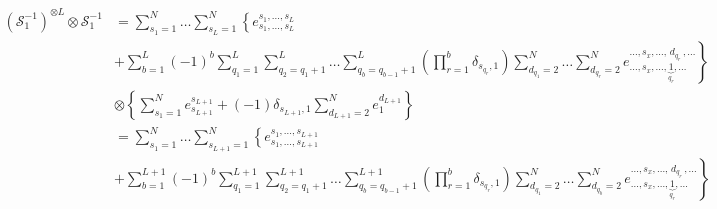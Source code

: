 \documentclass[11pt]{article}
\numberwithin{equation}{section}
\numberwithin{equation}{subsection}
\begin{document}
\begin{align*}
\left(\mathcal{S}_{1}^{-1}\right)^{\otimes L}\otimes \mathcal{S}_{1}^{-1}&=
\sum_{s_{1}=1}^{N}\ldots\sum_{s_{L}=1}^{N}\left\{e_{s_{1},\ldots,s_{L}}^{s_{1},\ldots,s_{L}}\right. \\&+\left. \sum_{b=1}^{L}(-1)^{b}\sum_{q_{1}=1}^{L}\sum_{q_{2}=q_{1}+1}^{L}\ldots\sum_{q_{b}=q_{b-1}+1}^{L}\left(\prod_{r=1}^{b}\delta_{s_{q_{r}},1}\right)\sum_{d_{q_{1}}=2}^{N}\ldots\sum_{d_{q_{r}}=2}^{N}e_{\ldots,s_{x},\ldots,\underbrace{1}_{q_{r}},\ldots}^{\ldots,s_{x},\ldots,\,d_{q_{r}}\,,\ldots}\right\}
\\&\otimes
\left\{ \sum_{s_{1}=1}^{N}e_{s_{L+1}}^{s_{L+1}}+(-1)\delta_{s_{L+1},1}\sum_{d_{L+1}=2}^{N}e_{1}^{d_{L+1}}\right\}
\\&=
\sum_{s_{1}=1}^{N}\ldots\sum_{s_{L+1}=1}^{N}\left\{e_{s_{1},\ldots,s_{L+1}}^{s_{1},\ldots,s_{L+1}}\right. \\&+\left. \sum_{b=1}^{L+1}(-1)^{b}\sum_{q_{1}=1}^{L+1}\sum_{q_{2}=q_{1}+1}^{L+1}\ldots\sum_{q_{b}=q_{b-1}+1}^{L+1}\left(\prod_{r=1}^{b}\delta_{s_{q_{r}},1}\right)\sum_{d_{q_{1}}=2}^{N}\ldots\sum_{d_{q_{b}}=2}^{N}e_{\ldots,s_{x},\ldots,\underbrace{1}_{q_{r}},\ldots}^{\ldots,s_{x},\ldots,\,d_{q_{r}}\,,\ldots}\right\}
\end{align*}
\end{document}
